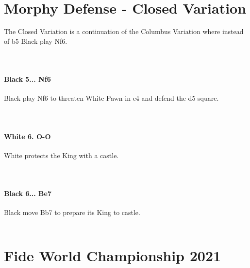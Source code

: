 \documentclass{article}
\begin{document}
\section{ Morphy Defense - Closed Variation}

The Closed Variation is a continuation of the Columbus Variation where instead of b5 Black play Nf6.\\
\\

\\
\\
\textbf{Black 5... Nf6}\\
\\
Black play Nf6 to threaten White Pawn in e4 and defend the d5 square.\\
\\

\\
\\
\textbf{White 6. O-O}\\
\\
White protects the King with a castle.\\
\\

\\
\\
\textbf{Black 6... Be7}\\
\\
Black move Bb7 to prepare its King to castle.\\
\\
\section{ Fide World Championship 2021}
\end{document}
